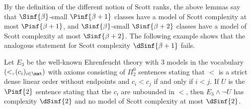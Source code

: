 \documentclass[10pt,a4paper]{amsart}
\renewcommand{\-}{\text{-}}
\begin{document}
By the definition of the different notion of Scott ranks, the above lemmas say that $\Sinf{\beta}$-small $\Pinf{\beta+1}$ classes have a model of Scott complexity at most $\Pinf{\beta+1}$, and $\Sinf{\beta}$-small $\Sinf{\beta+2}$ classes have a model of Scott complexity at most $\Sinf{\beta+2}$.
The following example shows that the analogous statement for Scott complexity $\dSinf{\beta+1}$ fails.
\begin{example}\label{ex:cutModels}
  Let $E_3$ be the well-known Ehrenfeucht theory with 3 models in the vocabulary $(<, (c_i)_{i\in\nat})$ with axioms consisting of $\Pi^0_2$ sentences stating that $<$ is a strict dense linear order without endpoints and $c_i< c_j$ if and only if $i<j$. If $U$ is the $\Pinf{2}$ sentence stating that the $c_i$ are unbounded in $<$, then $E_3\land \neg U$ has complexity $\dSinf{2}$ and no model of Scott complexity at most $\dSinf{2}$.
\end{example}
\end{document}

